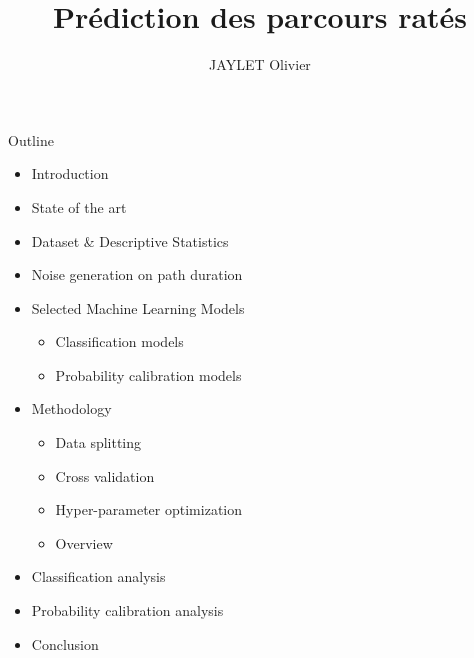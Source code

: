 \documentclass{beamer}
\title{Prédiction des parcours ratés}
\author{JAYLET Olivier}
\begin{document}
\begin{frame}
  \titlepage
\end{frame}

\begin{frame}{Outline}
    \begin{itemize}
        \item Introduction
        \item State of the art
        \item Dataset \& Descriptive Statistics
        \item Noise generation on path duration
        \item Selected Machine Learning Models
            \begin{itemize}
                \item Classification models
                \item Probability calibration models
            \end{itemize}
        \item Methodology
            \begin{itemize}
                \item Data splitting
                \item Cross validation
                \item Hyper-parameter optimization
                \item Overview
            \end{itemize}
        \item Classification analysis
        \item Probability calibration analysis
        \item Conclusion
    \end{itemize}
\end{frame}
    
\end{document}

